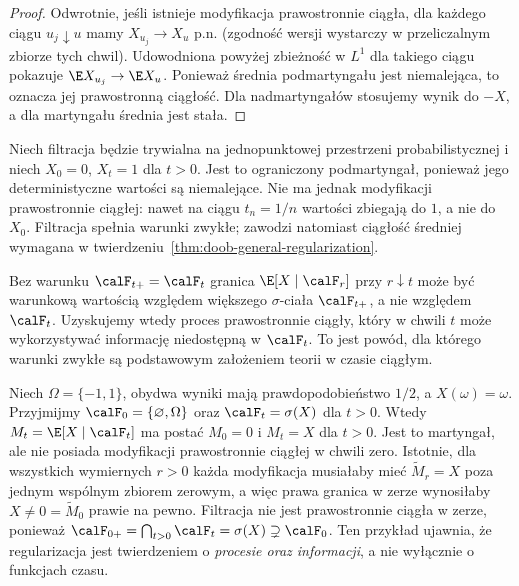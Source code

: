 \begin{proof}
Odwrotnie, jeśli istnieje modyfikacja
prawostronnie ciągła, dla każdego ciągu
$u_j\downarrow u$ mamy $X_{u_j}\to X_u$ p.n.
(zgodność wersji wystarczy w przeliczalnym
zbiorze tych chwil). Udowodniona powyżej
zbieżność w $L^1$ dla takiego ciągu pokazuje
$\E X_{u_j}\to\E X_u$. Ponieważ średnia
podmartyngału jest niemalejąca, to oznacza
jej prawostronną ciągłość.
Dla nadmartyngałów stosujemy wynik do $-X$,
a dla martyngału średnia jest stała.
\end{proof}

\begin{przyklad}
Niech filtracja będzie trywialna na jednopunktowej
przestrzeni probabilistycznej i niech
$X_0=0$, $X_t=1$ dla $t>0$. Jest to
ograniczony podmartyngał, ponieważ jego
deterministyczne wartości są niemalejące.
Nie ma jednak modyfikacji prawostronnie
ciągłej: nawet na ciągu $t_n=1/n$ wartości
zbiegają do $1$, a nie do $X_0$.
Filtracja spełnia warunki zwykłe; zawodzi
natomiast ciągłość średniej wymagana
w twierdzeniu~\ref{thm:doob-general-regularization}.
\end{przyklad}

\begin{uwaga}
Bez warunku $\calF_{t+}=\calF_t$ granica
$\E[X\mid\calF_r]$ przy $r\downarrow t$ może być
warunkową wartością względem większego $\sigma$-ciała
$\calF_{t+}$, a nie względem $\calF_t$.
Uzyskujemy wtedy proces prawostronnie ciągły, który w chwili
$t$ może wykorzystywać informację niedostępną w $\calF_t$.
To jest powód, dla którego warunki zwykłe są podstawowym
założeniem teorii w czasie ciągłym.
\end{uwaga}


\begin{przyklad}
Niech $\Omega=\{-1,1\}$, obydwa wyniki mają prawdopodobieństwo
$1/2$, a $X(\omega)=\omega$. Przyjmijmy $\calF_0=\{\varnothing,\Omega\}$
oraz $\calF_t=\sigma(X)$ dla $t>0$. Wtedy
$M_t=\E[X\mid\calF_t]$ ma postać $M_0=0$ i $M_t=X$ dla $t>0$.
Jest to martyngał, ale nie posiada modyfikacji prawostronnie ciągłej
w chwili zero. Istotnie, dla wszystkich wymiernych $r>0$
każda modyfikacja musiałaby mieć $\widetilde M_r=X$ poza jednym
wspólnym zbiorem zerowym, a więc prawa granica w zerze wynosiłaby
$X\ne0=\widetilde M_0$ prawie na pewno. Filtracja nie jest
prawostronnie ciągła w zerze, ponieważ
$\calF_{0+}=\bigcap_{t>0}\calF_t=\sigma(X)\supsetneq\calF_0$.
Ten przykład ujawnia, że regularizacja jest twierdzeniem o
\emph{procesie oraz informacji}, a nie wyłącznie o funkcjach czasu.
\end{przyklad}

